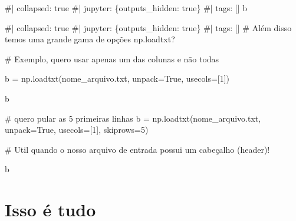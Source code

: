 \documentclass[
  letterpaper,
  DIV=11,
  numbers=noendperiod]{scrreprt}
\newenvironment{Shaded}{\begin{snugshade}}{\end{snugshade}}
\newcommand{\NormalTok}[1]{\textcolor[rgb]{0.00,0.23,0.31}{#1}}
\begin{document}
\begin{Shaded}
\begin{Highlighting}[]
\NormalTok{\#| collapsed: true}
\NormalTok{\#| jupyter: \{outputs\_hidden: true\}}
\NormalTok{\#| tags: []}
\NormalTok{b}
\end{Highlighting}
\end{Shaded}

\begin{Shaded}
\begin{Highlighting}[]
\NormalTok{\#| collapsed: true}
\NormalTok{\#| jupyter: \{outputs\_hidden: true\}}
\NormalTok{\#| tags: []}
\NormalTok{\# Além disso temos uma grande gama de opções}
\NormalTok{np.loadtxt?}
\end{Highlighting}
\end{Shaded}

\begin{Shaded}
\begin{Highlighting}[]
\NormalTok{\# Exemplo, quero usar apenas um das colunas e não todas}

\NormalTok{b = np.loadtxt(\textquotesingle{}nome\_arquivo.txt\textquotesingle{}, unpack=True, usecols=[1])}
\end{Highlighting}
\end{Shaded}

\begin{Shaded}
\begin{Highlighting}[]
\NormalTok{b}
\end{Highlighting}
\end{Shaded}

\begin{Shaded}
\begin{Highlighting}[]
\NormalTok{\# quero pular as 5 primeiras linhas}
\NormalTok{b = np.loadtxt(\textquotesingle{}nome\_arquivo.txt\textquotesingle{}, unpack=True, usecols=[1], skiprows=5)}

\NormalTok{\# Util quando o nosso arquivo de entrada possui um cabeçalho (header)!}
\end{Highlighting}
\end{Shaded}

\begin{Shaded}
\begin{Highlighting}[]
\NormalTok{b}
\end{Highlighting}
\end{Shaded}

\chapter{Isso é tudo}\label{isso-uxe9-tudo}
\end{document}
